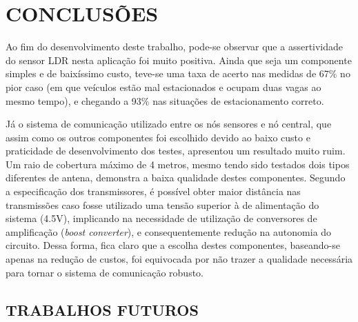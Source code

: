 \documentclass[oneside,openright,12pt]{ufsm_2015} %
\begin{document}
\chapter{CONCLUSÕES}
Ao fim do desenvolvimento deste trabalho, pode-se observar que a assertividade do sensor LDR nesta aplicação foi muito positiva. Ainda que seja um componente simples e de baixíssimo custo, teve-se uma taxa de acerto nas medidas de 67\% no pior caso (em que veículos estão mal estacionados e ocupam duas vagas ao mesmo tempo), e chegando a 93\% nas situações de estacionamento correto. 

Já o sistema de comunicação utilizado entre os nós sensores e nó central, que assim como os outros componentes foi escolhido devido ao baixo custo e praticidade de desenvolvimento dos testes, apresentou um resultado muito ruim. Um raio de cobertura máximo de 4 metros, mesmo tendo sido testados dois tipos diferentes de antena, demonstra a baixa qualidade destes componentes. Segundo a especificação dos transmissores, é possível obter maior distância nas transmissões caso fosse utilizado uma tensão superior à de alimentação do sistema (4.5V), implicando na necessidade de utilização de conversores de amplificação (\textit{boost converter}), e consequentemente redução na autonomia do circuito. Dessa forma, fica claro que a escolha destes componentes, baseando-se apenas na redução de custos, foi equivocada por não trazer a qualidade necessária para tornar o sistema de comunicação robusto.

\section{TRABALHOS FUTUROS}


        



\end{document}
